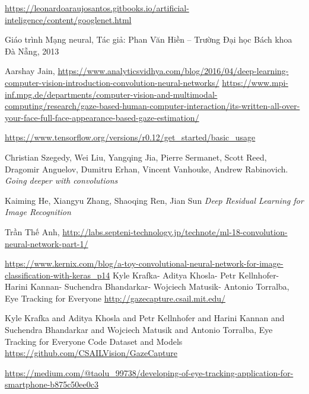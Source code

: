 \documentclass[12pt,a4paper,oneside]{book} %
\begin{document}
\begin{thebibliography}{99}
\url{https://leonardoaraujosantos.gitbooks.io/artificial-inteligence/content/googlenet.html}

Giáo trình Mạng neural, Tác giả: Phan Văn Hiền – Trường Đại học Bách khoa Đà Nẵng, 2013

 Aarshay Jain, 
\url{https://www.analyticsvidhya.com/blog/2016/04/deep-learning-computer-vision-introduction-convolution-neural-networks/}
\url{https://www.mpi-inf.mpg.de/departments/computer-vision-and-multimodal-computing/research/gaze-based-human-computer-interaction/its-written-all-over-your-face-full-face-appearance-based-gaze-estimation/}

\bibitem{}
\url{https://www.tensorflow.org/versions/r0.12/get_started/basic_usage}

Christian Szegedy, Wei Liu, Yangqing Jia, Pierre Sermanet, Scott Reed, Dragomir Anguelov, Dumitru Erhan, Vincent Vanhouke, Andrew Rabinovich. \textit{Going deeper with convolutions}

Kaiming He, Xiangyu Zhang, Shaoqing Ren, Jian Sun \textit{Deep Residual Learning for Image Recognition}

 Trần Thế Anh, 
\url{http://labs.septeni-technology.jp/technote/ml-18-convolution-neural-network-part-1/}

\url{https://www.kernix.com/blog/a-toy-convolutional-neural-network-for-image-classification-with-keras_p14}
Kyle Krafka- Aditya Khosla- Petr Kellnhofer- Harini Kannan- Suchendra Bhandarkar- Wojciech Matusik- Antonio Torralba, Eye Tracking for Everyone
\url{http://gazecapture.csail.mit.edu/}

Kyle Krafka and Aditya Khosla and Petr Kellnhofer and Harini Kannan and Suchendra Bhandarkar and Wojciech Matusik and Antonio Torralba, Eye Tracking for Everyone Code Dataset and Models
\url{https://github.com/CSAILVision/GazeCapture}

\url{https://medium.com/@taolu_99738/developing-of-eye-tracking-application-for-smartphone-b875c50ee0c3}

\end{thebibliography}
\end{document}
